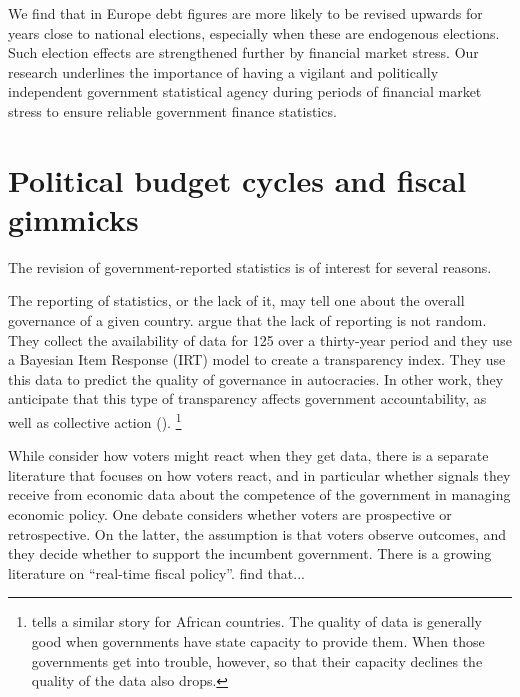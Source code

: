\documentclass[]{article}
\begin{document}
We find that in Europe debt figures are more likely to be revised upwards for years close to national elections, especially when these are endogenous elections. Such election effects are strengthened further by financial market stress. Our research underlines the importance of having a vigilant and politically independent government statistical agency during periods of financial market stress to ensure reliable government finance statistics.

\section{Political budget cycles and fiscal gimmicks}

The revision of government-reported statistics is of interest for several reasons.

The reporting of statistics, or the lack of it, may tell one about the overall governance of a given country. \cite{Hollyer2014} argue that the lack of reporting is not random. They collect the availability of data for 125 over a thirty-year period and they use a Bayesian Item Response  (IRT) model to create a transparency index.  They use this data to predict the quality of governance in autocracies. In other work, they anticipate that this type of transparency affects government accountability, as well as collective action (\cite{hollyerforthcoming}). \footnote{\cite{jervin2013} tells a similar story for African countries. The quality of data is generally good when governments have state capacity to provide them. When those governments get into trouble, however, so that their capacity declines the quality of the data also drops.}

While \cite{Hollyer2014} consider how voters might react when they get data, there is a separate literature that focuses on how voters react, and in particular whether signals they receive from economic data about the competence of the government in managing economic policy. One debate considers whether voters are prospective or retrospective. On the latter, the assumption is that voters observe outcomes, and they decide whether to support the incumbent government. There is a growing literature on ``real-time fiscal policy''. \cite{kayser_peress} find that...
\end{document}
